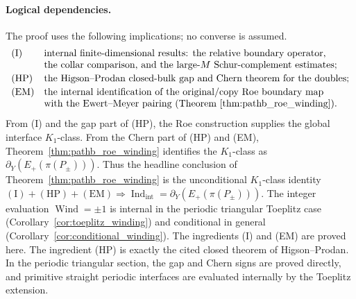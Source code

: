 \documentclass[11pt]{article}
\numberwithin{equation}{section}
\theoremstyle{definition}
\theoremstyle{remark}
\newcommand{\Indint}{\operatorname{Ind}_{\mathrm{int}}}
\begin{document}
\paragraph{Logical dependencies.}
The proof uses the following implications; no converse is assumed.
\[
\begin{array}{ll}
\mathrm{(I)} & \text{internal finite-dimensional results: the relative boundary operator,}\\
& \text{the collar comparison, and the large-\(M\) Schur-complement estimates;}\\[0.2em]
\mathrm{(HP)} & \text{the Higson--Prodan closed-bulk gap and Chern theorem for the doubles;}\\[0.2em]
\mathrm{(EM)} & \text{the internal identification of the original/copy Roe boundary map}\\
& \text{with the Ewert--Meyer pairing (Theorem~\ref{thm:pathb_roe_winding}).}
\end{array}
\]
From (I) and the gap part of (HP), the Roe construction supplies the global interface
\(K_1\)-class. From the Chern part of (HP) and (EM), Theorem~\ref{thm:pathb_roe_winding}
identifies the \(K_1\)-class as \(\partial_Y(E_+(\pi(P_\pm)))\). Thus the headline conclusion
of Theorem~\ref{thm:pathb_roe_winding} is the unconditional
\(K_1\)-class identity
\(\mathrm{(I)}+\mathrm{(HP)}+\mathrm{(EM)}\Longrightarrow
\Indint=\partial_Y(E_+(\pi(P_\pm)))\). The integer evaluation
\(\operatorname{Wind}=\pm1\) is internal in the periodic triangular Toeplitz case
(Corollary~\ref{cor:toeplitz_winding}) and conditional in general
(Corollary~\ref{cor:conditional_winding}). The ingredients (I) and (EM) are proved here. The
ingredient (HP) is exactly the cited closed theorem of Higson--Prodan. In the periodic
triangular section, the gap and Chern signs are proved directly, and primitive straight
periodic interfaces are evaluated internally by the Toeplitz extension.
\end{document}
